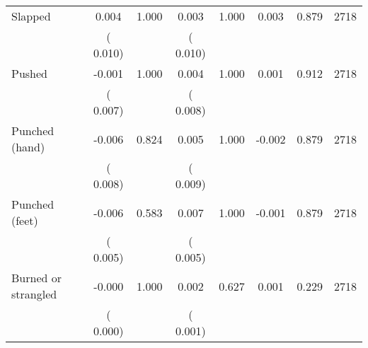 \begin{tabular}{l*{7}{c}}
 Slapped       &              0.004       &        1.000  &              0.003       &        1.000  &              0.003       &              0.879 &  2718 \\ 
                       &       (       0.010)             &                               &       (       0.010)                     &                               &                                               &                                &                      \\ 

 Pushed       &             -0.001       &        1.000  &              0.004       &        1.000  &              0.001       &              0.912 &  2718 \\ 
                       &       (       0.007)             &                               &       (       0.008)                     &                               &                                               &                                &                      \\ 

 Punched (hand)       &             -0.006       &        0.824  &              0.005       &        1.000  &             -0.002       &              0.879 &  2718 \\ 
                       &       (       0.008)             &                               &       (       0.009)                     &                               &                                               &                                &                      \\ 

 Punched (feet)       &             -0.006       &        0.583  &              0.007       &        1.000  &             -0.001       &              0.879 &  2718 \\ 
                       &       (       0.005)             &                               &       (       0.005)                     &                               &                                               &                                &                      \\ 

 Burned or strangled       &             -0.000       &        1.000  &              0.002       &        0.627  &              0.001       &              0.229 &  2718 \\ 
                       &       (       0.000)             &                               &       (       0.001)                     &                               &                                               &                                &                      \\ 


\end{tabular}
